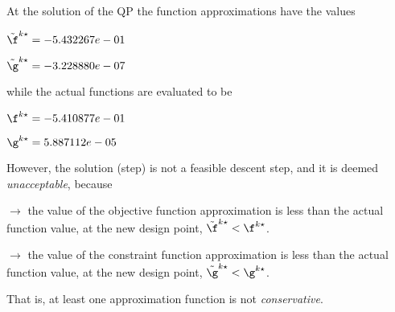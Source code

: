At the solution of the QP the function approximations have the values

$\tilde \f^{k\star} = -5.432267e-01$

$\tilde \g^{k\star} = -3.228880e-07$

\bigskip
while the actual functions are evaluated to be

$\f^{k\star} = -5.410877e-01$

$\g^{k\star} =  5.887112e-05$

\bigskip
 However, the solution (step)                         is not a feasible descent step, and it is deemed                         \emph{unacceptable}, because 
 
$\to$ the value of the objective                             function approximation is less than the actual function                             value, at the new design point,                             $\tilde {\f}^{k\star} < {\f}^{k\star}$.

 $\to$ the value of the constraint function                             approximation is less than the actual function value, at                             the new design point, $\tilde {\g}^{k\star} < {\g}^{k\star}$.

 \bigskip 

 That is, at least one approximation                         function is not \emph{conservative}.
